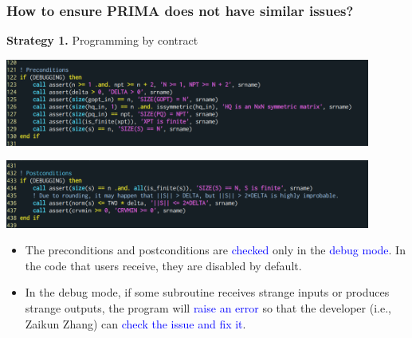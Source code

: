 \documentclass[slidestop,mathserif,xcolor=dvipsnames]{beamer}
\newcommand{\blue}[1]{\textcolor{blue}{#1}}
\begin{document}
\begin{frame}
    \frametitle{How to ensure PRIMA does not have similar issues? }
    \textbf{Strategy 1.} Programming by contract
    \begin{center}
    \includegraphics[width=0.9\textwidth]{newuoa_preconditions.png}
    \end{center}

    \begin{center}
    \includegraphics[width=0.9\textwidth]{newuoa_postconditions.png}
    \end{center}

    \begin{itemize}
        \item The preconditions and postconditions are \blue{checked} only in the \blue{debug mode}.
            In the code that users receive, they are disabled by default.%
            \vspace{0.5ex}
        \item
            In the debug mode,
            if some subroutine receives strange inputs or produces strange outputs, the program
            will \blue{raise an error} so that the developer (i.e., Zaikun Zhang) can \blue{check the issue and fix it}.
    \end{itemize}
\end{frame}
\end{document}
